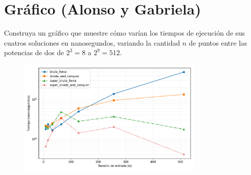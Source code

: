 \documentclass[informe.tex]{subfiles}
\begin{document}
\section{Gráfico (Alonso y Gabriela)}
Construya un gráfico que muestre cómo varían los tiempos de ejecución de sus cuatros soluciones en
nanosegundos, variando la cantidad $n$ de puntos entre las potencias de dos de $2^3=8$ a $2^9=512$.

\begin{figure}[h]
	\centering \includegraphics[width=0.8\textwidth]{img/plot_all.png}
\end{figure}
\end{document}
